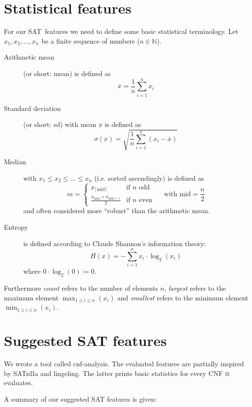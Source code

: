 \section{Statistical features}
\label{sec:features-stats}
%
For our SAT~features we need to define some basic statistical terminology.
Let $x_1, x_2, \ldots, x_n$ be a finite sequence of numbers ($n \in \mathbb N$).
\begin{description}
  \item[Arithmetic mean] (or short: mean)
    is defined as
    \[ \overline{x} = \frac1n \sum_{i=1}^n x_i \]
  \item[Standard deviation] (or short: sd)
    with mean $\overline{x}$ is defined as
    \[ \sigma(x) = \sqrt{\frac1n \sum_{i=1}^n (x_i - \overline{x})} \]
  \item[Median]
    with $x_1 \leq x_2 \leq \ldots \leq x_n$
    (i.e. sorted ascendingly) is defined as
    \[
       m = \begin{cases}
         x_{\lceil \text{mid}\rceil} & \text{if } n \text{ odd} \\
         \frac{x_{\text{mid}} + x_{\text{mid} + 1}}{2} & \text{if } n \text{ even}
       \end{cases}
       \quad\text{ with } \text{mid} = \frac{n}{2}
    \]
    and often considered more \enquote{robust} than the arithmetic mean.
  \item[Entropy]
    is defined according to Claude Shannon's information theory:
    \[ H(x) = -\sum_{i=1}^n x_i \cdot \log_2(x_i) \]
    where $0 \cdot \log_2(0) \coloneqq 0$.
\end{description}

Furthermore \emph{count} refers to the number of elements $n$,
\emph{largest} refers to the maximum element $\max_{1 \leq i \leq n}(x_i)$
and \emph{smallest} refers to the minimum element $\min_{1 \leq i \leq n}(x_i)$.

\section{Suggested SAT features}
\label{sec:features-suggested}
%
We wrote a tool called cnf-analysis. The evaluated features are partially inspired
by SATzilla and lingeling. The latter prints basic statistics for every CNF it
evaluates.

A summary of our suggested SAT features is given:

